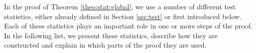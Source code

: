 \documentclass[a4paper,12pt]{article}
\newcommand{\doublehattwo}[1]{\widehat{\widehat{#1}}}
\begin{document}
In the proof of Theorem \ref{theo:stat:global}, we use a number of different test statistics, either already defined in Section \ref{sec:test} or first introduced below. Each of these statistics plays an important role in one or more steps of the proof. In the following list, we present these statistics, describe how they are constructed and explain in which parts of the proof they are used. %
\end{document}
